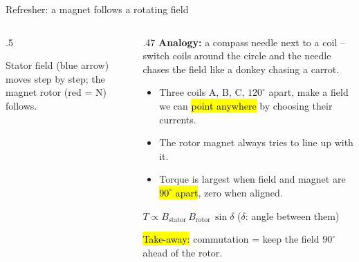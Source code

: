 \documentclass[aspectratio=169,10pt]{beamer}
\begin{document}
\begin{frame}{Refresher: a magnet follows a rotating field}
\begin{columns}[T]
\begin{column}{.5\textwidth}
\centering
{}

\vspace{2mm}
{\scriptsize\color{mkGray} Stator field (blue arrow) moves step by step; the magnet rotor (red = N) follows.}
\end{column}
\begin{column}{.47\textwidth}
\small
\textbf{Analogy:} a compass needle next to a coil -- switch coils around the circle and the needle chases the field like a donkey chasing a carrot.
\begin{itemize}\setlength\itemsep{2pt}
\item Three coils A, B, C, $120^\circ$ apart, make a field we can \hl{point anywhere} by choosing their currents.
\item The rotor magnet always tries to line up with it.
\item Torque is largest when field and magnet are \hl{$90^\circ$ apart}, zero when aligned.
\end{itemize}
\begin{eqbox}
$T\propto B_\text{stator}\,B_\text{rotor}\,\sin\delta$ \quad ($\delta$: angle between them)
\end{eqbox}
\hl{Take-away:} commutation = keep the field $90^\circ$ ahead of the rotor.
\end{column}
\end{columns}
\end{frame}
\end{document}

